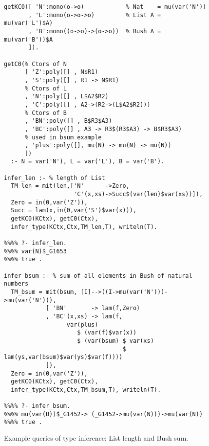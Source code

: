 \documentclass[runningheads,a4paper]{llncs}
\newcommand{\TODO}[1]{\textcolor{magenta}{TODO: #1}}
\begin{document}


\begin{figure}\small
\begin{verbatim}
getKC0([ 'N':mono(o->o)            % Nat    = mu(var('N'))
       , 'L':mono(o->o->o)         % List A = mu(var('L')$A)
       , 'B':mono((o->o)->(o->o))  % Bush A = mu(var('B'))$A
       ]).

getC0(% Ctors of N
      [ 'Z':poly([] , N$R1)
      , 'S':poly([] , R1 -> N$R1)
      % Ctors of L
      , 'N':poly([] , L$A2$R2)
      , 'C':poly([] , A2->(R2->(L$A2$R2)))
      % Ctors of B
      , 'BN':poly([] , B$R3$A3)
      , 'BC':poly([] , A3 -> R3$(R3$A3) -> B$R3$A3)
      % used in bsum example
      , 'plus':poly([], mu(N) -> mu(N) -> mu(N))
      ])
  :- N = var('N'), L = var('L'), B = var('B').

infer_len :- % length of List
  TM_len = mit(len,['N'      ->Zero,
                    'C'(x,xs)->Succ$(var(len)$var(xs))]),
  Zero = in(0,var('Z')),
  Succ = lam(x,in(0,var('S')$var(x))),
  getKC0(KCtx), getC0(Ctx),
  infer_type(KCtx,Ctx,TM_len,T), writeln(T).

%%%% ?- infer_len.
%%%% var(N)$_G1653
%%%% true .

infer_bsum :- % sum of all elements in Bush of natural numbers
  TM_bsum = mit(bsum, [I]-->((I->mu(var('N')))->mu(var('N'))),
            [ 'BN'       -> lam(f,Zero)
            , 'BC'(x,xs) -> lam(f,
                  var(plus)
                     $ (var(f)$var(x))
                     $ (var(bsum) $ var(xs)
                                  $ lam(ys,var(bsum)$var(ys)$var(f))))
            ]),
  Zero = in(0,var('Z')),
  getKC0(KCtx), getC0(Ctx),
  infer_type(KCtx,Ctx,TM_bsum,T), writeln(T).

%%%% ?- infer_bsum.
%%%% mu(var(B))$_G1452-> (_G1452->mu(var(N)))->mu(var(N))
%%%% true .
\end{verbatim}
\caption{Example queries of type inference: List length and Bush sum.}
\label{fig:TIexample}
\end{figure}
\end{document}
